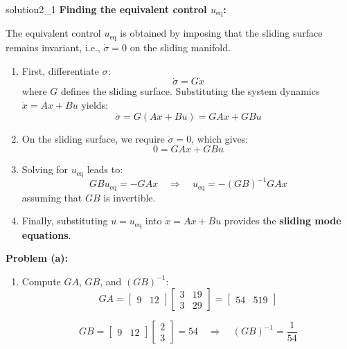 \begin{solution}{}{solution2_1}
	\textbf{Finding the equivalent control \( u_{\text{eq}} \):}

	The equivalent control \( u_{\text{eq}} \) is obtained by imposing that the sliding surface remains invariant, i.e., \( \dot{\sigma} = 0 \) on the sliding manifold.

	\begin{enumerate}
		\item First, differentiate \( \sigma \):
		      \[
			      \dot{\sigma} = G\dot{x}
		      \]
		      where \( G \) defines the sliding surface. Substituting the system dynamics \( \dot{x} = Ax + Bu \) yields:
		      \[
			      \dot{\sigma} = G(Ax + Bu) = GAx + GBu
		      \]

		\item On the sliding surface, we require \( \dot{\sigma} = 0 \), which gives:
		      \[
			      0 = GAx + GBu
		      \]

		\item Solving for \( u_{\text{eq}} \) leads to:
		      \[
			      GBu_{\text{eq}} = -GAx \quad \Rightarrow \quad u_{\text{eq}} = -(GB)^{-1}GAx
		      \]
		      assuming that \( GB \) is invertible.

		\item Finally, substituting \( u = u_{\text{eq}} \) into \( \dot{x} = Ax + Bu \) provides the \textbf{sliding mode equations}.
	\end{enumerate}

	\bigskip

	\textbf{Problem (a):}

	\begin{enumerate}
		\item Compute \( GA \), \( GB \), and \( (GB)^{-1} \):
		      \[
			      GA = \begin{bmatrix} 9 & 12 \end{bmatrix}
			      \begin{bmatrix}
				      3 & 19 \\
				      3 & 29
			      \end{bmatrix}
			      = \begin{bmatrix}
				      54 & 519
			      \end{bmatrix}
		      \]

		      \[
			      GB = \begin{bmatrix} 9 & 12 \end{bmatrix}
			      \begin{bmatrix}
				      2 \\ 3
			      \end{bmatrix}
			      = 54
			      \quad \Rightarrow \quad (GB)^{-1} = \frac{1}{54}
		      \]


\end{enumerate}
\end{solution}
